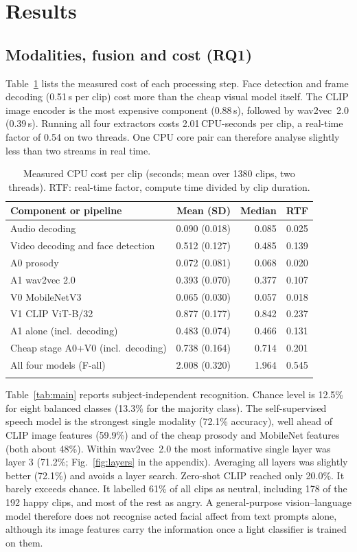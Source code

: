 \section{Results}\label{sec:results}

\subsection{Modalities, fusion and cost (RQ1)}

Table~\ref{tab:cost} lists the measured cost of each processing step. Face detection and frame decoding (0.51\,s per clip) cost more than the cheap visual model itself. The CLIP image encoder is the most expensive component (0.88\,s), followed by wav2vec~2.0 (0.39\,s). Running all four extractors costs 2.01\,CPU-seconds per clip, a real-time factor of 0.54 on two threads. One CPU core pair can therefore analyse slightly less than two streams in real time.

\begin{table}[t]
\caption{Measured CPU cost per clip (seconds; mean over 1380 clips, two threads). RTF: real-time factor, compute time divided by clip duration.}\label{tab:cost}
\centering\footnotesize
\begin{tabular}{@{}lrrr@{}}
\toprule
Component or pipeline & Mean (SD) & Median & RTF \\
\midrule
Audio decoding & 0.090 (0.018) & 0.085 & 0.025 \\
Video decoding and face detection & 0.512 (0.127) & 0.485 & 0.139 \\
A0 prosody & 0.072 (0.081) & 0.068 & 0.020 \\
A1 wav2vec 2.0 & 0.393 (0.070) & 0.377 & 0.107 \\
V0 MobileNetV3 & 0.065 (0.030) & 0.057 & 0.018 \\
V1 CLIP ViT-B/32 & 0.877 (0.177) & 0.842 & 0.237 \\
\midrule
A1 alone (incl.\ decoding) & 0.483 (0.074) & 0.466 & 0.131 \\
Cheap stage A0+V0 (incl.\ decoding) & 0.738 (0.164) & 0.714 & 0.201 \\
All four models (F-all) & 2.008 (0.320) & 1.964 & 0.545 \\
\botrule
\end{tabular}
\end{table}

Table~\ref{tab:main} reports subject-independent recognition. Chance level is 12.5\% for eight balanced classes (13.3\% for the majority class). The self-supervised speech model is the strongest single modality (72.1\% accuracy), well ahead of CLIP image features (59.9\%) and of the cheap prosody and MobileNet features (both about 48\%). Within wav2vec~2.0 the most informative single layer was layer 3 (71.2\%; Fig.~\ref{fig:layers} in the appendix). Averaging all layers was slightly better (72.1\%) and avoids a layer search. Zero-shot CLIP reached only 20.0\%. It barely exceeds chance. It labelled 61\% of all clips as neutral, including 178 of the 192 happy clips, and most of the rest as angry. A general-purpose vision--language model therefore does not recognise acted facial affect from text prompts alone, although its image features carry the information once a light classifier is trained on them.

